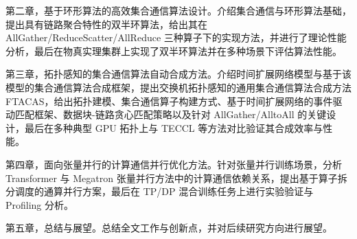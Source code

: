 第二章，基于环形算法的高效集合通信算法设计。介绍集合通信与环形算法基础，提出具有链路聚合特性的双半环算法，给出其在 AllGather/ReduceScatter/AllReduce 三种算子下的实现方法，并进行了理论性能分析，最后在物真实理集群上实现了双半环算法并在多种场景下评估算法性能。


第三章，拓扑感知的集合通信算法自动合成方法。介绍时间扩展网络模型与基于该模型的集合通信算法合成框架，提出交换机拓扑感知的通用集合通信算法合成方法 FTACAS，给出拓扑建模、集合通信算子构建方式、基于时间扩展网络的事件驱动匹配框架、数据块-链路贪心匹配策略以及针对 AllGather/AlltoAll 的关键设计，最后在多种典型 GPU 拓扑上与 TECCL 等方法对比验证其合成效率与性能。

第四章，面向张量并行的计算通信并行优化方法。针对张量并行训练场景，分析 Transformer 与 Megatron 张量并行方法中的计算通信依赖关系，提出基于算子拆分调度的通算并行方案，最后在 TP/DP 混合训练任务上进行实验验证与 Profiling 分析。

第五章，总结与展望。总结全文工作与创新点，并对后续研究方向进行展望。

